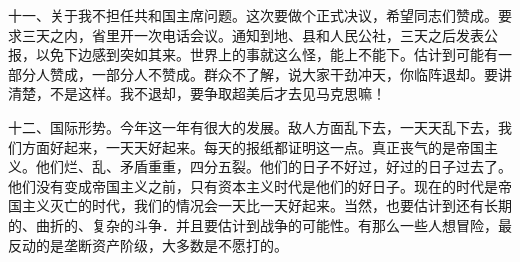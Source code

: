 十一、关于我不担任共和国主席问题。这次要做个正式决议，希望同志们赞成。要求三天之内，省里开一次电话会议。通知到地、县和人民公社，三天之后发表公报，以免下边感到突如其来。世界上的事就这么怪，能上不能下。估计到可能有一部分人赞成，一部分人不赞成。群众不了解，说大家干劲冲天，你临阵退却。要讲清楚，不是这样。我不退却，要争取超美后才去见马克思嘛！

十二、国际形势。今年这一年有很大的发展。敌人方面乱下去，一天天乱下去，我们方面好起来，一天天好起来。每天的报纸都证明这一点。真正丧气的是帝国主义。他们烂、乱、矛盾重重，四分五裂。他们的日子不好过，好过的日子过去了。他们没有变成帝国主义之前，只有资本主义时代是他们的好日子。现在的时代是帝国主义灭亡的时代，我们的情况会一天比一天好起来。当然，也要估计到还有长期的、曲折的、复杂的斗争．并且要估计到战争的可能性。有那么一些人想冒险，最反动的是垄断资产阶级，大多数是不愿打的。
